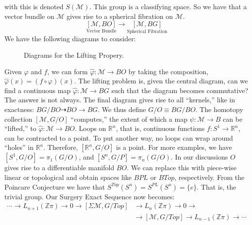 \documentclass[crop=false,class=book,oneside]{standalone}
\begin{document}
        with this is denoted $S(\mathcal{M})$. This group
        is a classifying space. So we have that a vector
        bundle on $\mathcal{M}$ gives rise to a spherical
        fibration on $\mathcal{M}$.
        \begin{equation*}
            \underset{\textrm{Vector Bundle}}{[\mathcal{M},BO]}
            \longrightarrow
            \underset{\textrm{Spherical Fibration}}{[\mathcal{M},BG]}
        \end{equation*}
        We have the following diagrams to consider:
        \begin{figure}
            \centering
            \captionsetup{type=figure}
            \caption{Diagrams for the Lifting Propery.}
            \label{fig:Surgery_Theory_Lifting_Property_Diagram}
        \end{figure}
        Given $\varphi$ and $f$, we can form
        $\hat{\varphi}:\mathcal{M}\rightarrow{BO}$ by taking
        the composition, $\hat{\varphi}(x)=(f\circ\varphi)(x)$.
        The lifting problem is, given the central diagram,
        can we find a continuous map
        $\hat{\varphi}:\mathcal{M}\rightarrow{BG}$ such that
        the diagram becomes commutative? The answer is not always.
        The final diagram gives rise to all ``kernels,'' like
        in exactness: $BG/BO\dashrightarrow{BO}\rightarrow{BG}$.
        We thus define $G/O\equiv{BG/BO}$. The homotopy collection
        $[\mathcal{M},G/O]$ ``computes,'' the extent of which a map
        $\psi:\mathcal{M}\rightarrow{B}$ can be ``lifted,'' to
        $\hat{\varphi}:\mathcal{M}\rightarrow{BO}$.
        Loops on $\mathbb{R}^{n}$, that is, continuous functions
        $f:S^{1}\rightarrow\mathbb{R}^{n}$, can be
        contracted to a point. To put another way, no loops
        can wrap around ``holes'' in $\mathbb{R}^{n}$.
        Therefore, $[\mathbb{R}^{n},G/O]$ is a point. For
        more examples, we have
        $[S^{1},G/O]=\pi_{1}(G/O)$, and
        $[S^{n},G/P]=\pi_{n}(G/O)$. In our discussions
        $O$ gives rise to a differentiable manifold $BO$.
        We can replace this with piece-wise linear or
        topological and obtain spaces like
        $BPL$ or $BTop$, respectively.
        From the Poincare Conjecture we have that
        $S^{Top}(S^{n})=S^{PL}(S^{n})=\{e\}$. That is,
        the trivial group. Our Surgery Exact Sequence now
        becomes:
        \begin{align*}
            \cdots\rightarrow{L}_{n+1}(\mathbb{Z}\pi)
            \rightarrow0\rightarrow
            [\Sigma\mathcal{M},G/Top]&\rightarrow
            L_{n}(\mathbb{Z}\pi)\rightarrow
            0\rightarrow\\
            &\rightarrow[\mathcal{M},G/Top]\rightarrow
            L_{n-1}(\mathbb{Z}\pi)\rightarrow\cdots
        \end{align*}
\end{document}
